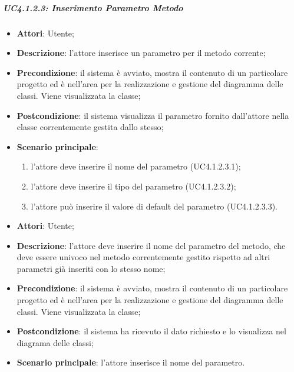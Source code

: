 \subparagraph{UC4.1.2.3: Inserimento Parametro Metodo}
\label{UC4.1.2.3}
\begin{itemize}
	\item \textbf{Attori}: Utente;
	\item \textbf{Descrizione}: l'attore inserisce un parametro per il metodo corrente;
	\item \textbf{Precondizione}:  il sistema è avviato, mostra il contenuto di un particolare progetto ed è nell'area per la realizzazione e gestione del diagramma delle classi. Viene visualizzata la classe;
	\item \textbf{Postcondizione}: il sistema visualizza il parametro fornito dall'attore nella classe correntemente gestita dallo stesso;
	\item \textbf{Scenario principale}:
	\begin{enumerate}
		\item l'attore deve inserire il nome del parametro (UC4.1.2.3.1);
		\item l'attore deve inserire il tipo del parametro (UC4.1.2.3.2);
		\item l'attore può inserire il valore di default del parametro (UC4.1.2.3.3).
	\end{enumerate}
\end{itemize}

\label{UC4.1.2.3.1}
\begin{itemize}
	\item \textbf{Attori}: Utente;
	\item \textbf{Descrizione}: l'attore deve inserire il nome del parametro del metodo, che deve essere univoco nel metodo correntemente gestito rispetto ad altri parametri già inseriti con lo stesso nome;
	\item \textbf{Precondizione}: il sistema è avviato, mostra il contenuto di un particolare progetto ed è nell'area per la realizzazione e gestione del diagramma delle classi. Viene visualizzata la classe;
	\item \textbf{Postcondizione}: il sistema ha ricevuto il dato richiesto e lo visualizza nel diagrama delle classi;
	\item \textbf{Scenario principale}: l'attore inserisce il nome del parametro.
\end{itemize}

